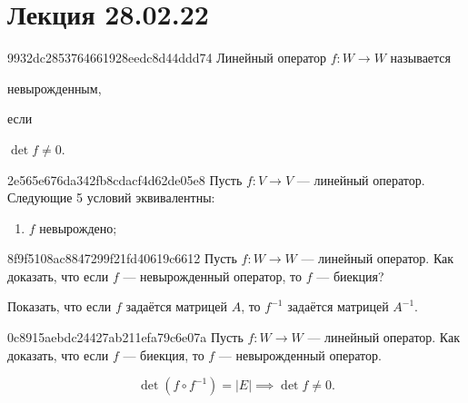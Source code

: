 \section{Лекция 28.02.22}
\begin{note}{9932dc2853764661928eedc8d44ddd74}
    Линейный оператор \( f : W \to W \) называется \begin{icloze}{2}невырожденным,\end{icloze} если \begin{icloze}{1}\( \det f \neq 0 \).\end{icloze}
\end{note}

\begin{note}{2e565e676da342fb8cdacf4d62de05e8}
    Пусть \( f : V \to V \) --- линейный оператор. Следующие 5 условий эквивалентны:
    \begin{enumerate}
        \item \( f \) невырождено;
    \end{enumerate}
\end{note}

\begin{note}{8f9f5108ac8847299f21fd40619c6612}
    Пусть \( f : W \to W \) --- линейный оператор. Как доказать, что если \( f \) --- невырожденный оператор, то \( f \) --- биекция?

    \begin{cloze}{1}
        Показать, что если \( f \) задаётся матрицей \( A \), то \( f^{-1} \) задаётся матрицей \( A^{-1} \).
    \end{cloze}
\end{note}

\begin{note}{0c8915aebdc24427ab211efa79c6e07a}
    Пусть \( f : W \to W \) --- линейный оператор. Как доказать, что если \( f \) --- биекция, то \( f \) --- невырожденный оператор.

    \begin{cloze}{1}
        \[
            \det (f \circ f^{-1}) = |E| \implies \det f \neq 0.
        \]
    \end{cloze}
\end{note}

